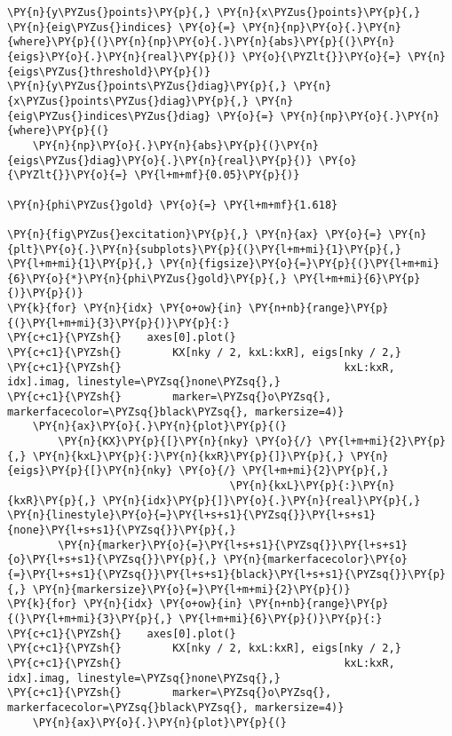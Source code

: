 \begin{Verbatim}[commandchars=\\\{\}]
\PY{n}{y\PYZus{}points}\PY{p}{,} \PY{n}{x\PYZus{}points}\PY{p}{,} \PY{n}{eig\PYZus{}indices} \PY{o}{=} \PY{n}{np}\PY{o}{.}\PY{n}{where}\PY{p}{(}\PY{n}{np}\PY{o}{.}\PY{n}{abs}\PY{p}{(}\PY{n}{eigs}\PY{o}{.}\PY{n}{real}\PY{p}{)} \PY{o}{\PYZlt{}}\PY{o}{=} \PY{n}{eigs\PYZus{}threshold}\PY{p}{)}
\PY{n}{y\PYZus{}points\PYZus{}diag}\PY{p}{,} \PY{n}{x\PYZus{}points\PYZus{}diag}\PY{p}{,} \PY{n}{eig\PYZus{}indices\PYZus{}diag} \PY{o}{=} \PY{n}{np}\PY{o}{.}\PY{n}{where}\PY{p}{(}
    \PY{n}{np}\PY{o}{.}\PY{n}{abs}\PY{p}{(}\PY{n}{eigs\PYZus{}diag}\PY{o}{.}\PY{n}{real}\PY{p}{)} \PY{o}{\PYZlt{}}\PY{o}{=} \PY{l+m+mf}{0.05}\PY{p}{)}

\PY{n}{phi\PYZus{}gold} \PY{o}{=} \PY{l+m+mf}{1.618}

\PY{n}{fig\PYZus{}excitation}\PY{p}{,} \PY{n}{ax} \PY{o}{=} \PY{n}{plt}\PY{o}{.}\PY{n}{subplots}\PY{p}{(}\PY{l+m+mi}{1}\PY{p}{,} \PY{l+m+mi}{1}\PY{p}{,} \PY{n}{figsize}\PY{o}{=}\PY{p}{(}\PY{l+m+mi}{6}\PY{o}{*}\PY{n}{phi\PYZus{}gold}\PY{p}{,} \PY{l+m+mi}{6}\PY{p}{)}\PY{p}{)}
\PY{k}{for} \PY{n}{idx} \PY{o+ow}{in} \PY{n+nb}{range}\PY{p}{(}\PY{l+m+mi}{3}\PY{p}{)}\PY{p}{:}
\PY{c+c1}{\PYZsh{}    axes[0].plot(}
\PY{c+c1}{\PYZsh{}        KX[nky / 2, kxL:kxR], eigs[nky / 2,}
\PY{c+c1}{\PYZsh{}                                   kxL:kxR, idx].imag, linestyle=\PYZsq{}none\PYZsq{},}
\PY{c+c1}{\PYZsh{}        marker=\PYZsq{}o\PYZsq{}, markerfacecolor=\PYZsq{}black\PYZsq{}, markersize=4)}
    \PY{n}{ax}\PY{o}{.}\PY{n}{plot}\PY{p}{(}
        \PY{n}{KX}\PY{p}{[}\PY{n}{nky} \PY{o}{/} \PY{l+m+mi}{2}\PY{p}{,} \PY{n}{kxL}\PY{p}{:}\PY{n}{kxR}\PY{p}{]}\PY{p}{,} \PY{n}{eigs}\PY{p}{[}\PY{n}{nky} \PY{o}{/} \PY{l+m+mi}{2}\PY{p}{,}
                                   \PY{n}{kxL}\PY{p}{:}\PY{n}{kxR}\PY{p}{,} \PY{n}{idx}\PY{p}{]}\PY{o}{.}\PY{n}{real}\PY{p}{,} \PY{n}{linestyle}\PY{o}{=}\PY{l+s+s1}{\PYZsq{}}\PY{l+s+s1}{none}\PY{l+s+s1}{\PYZsq{}}\PY{p}{,}
        \PY{n}{marker}\PY{o}{=}\PY{l+s+s1}{\PYZsq{}}\PY{l+s+s1}{o}\PY{l+s+s1}{\PYZsq{}}\PY{p}{,} \PY{n}{markerfacecolor}\PY{o}{=}\PY{l+s+s1}{\PYZsq{}}\PY{l+s+s1}{black}\PY{l+s+s1}{\PYZsq{}}\PY{p}{,} \PY{n}{markersize}\PY{o}{=}\PY{l+m+mi}{2}\PY{p}{)}
\PY{k}{for} \PY{n}{idx} \PY{o+ow}{in} \PY{n+nb}{range}\PY{p}{(}\PY{l+m+mi}{3}\PY{p}{,} \PY{l+m+mi}{6}\PY{p}{)}\PY{p}{:}
\PY{c+c1}{\PYZsh{}    axes[0].plot(}
\PY{c+c1}{\PYZsh{}        KX[nky / 2, kxL:kxR], eigs[nky / 2,}
\PY{c+c1}{\PYZsh{}                                   kxL:kxR, idx].imag, linestyle=\PYZsq{}none\PYZsq{},}
\PY{c+c1}{\PYZsh{}        marker=\PYZsq{}o\PYZsq{}, markerfacecolor=\PYZsq{}black\PYZsq{}, markersize=4)}
    \PY{n}{ax}\PY{o}{.}\PY{n}{plot}\PY{p}{(}

\end{Verbatim}
